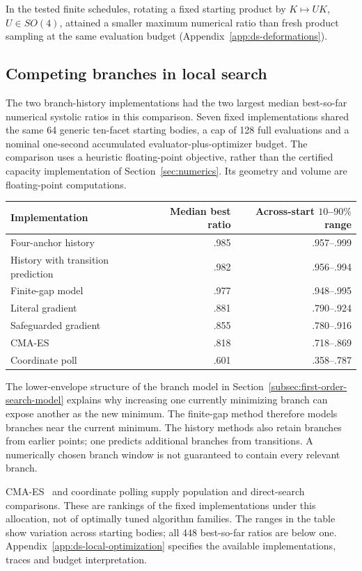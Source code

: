 In the tested finite schedules, rotating a fixed starting product by
$K\mapsto UK$, $U\in SO(4)$, attained a smaller maximum numerical ratio
than fresh product sampling at the same evaluation budget
(Appendix~\ref{app:ds-deformations}).

\subsection{Competing branches in local search}
\label{subsec:black-box-datascience-finite-budget-optimization}

The two branch-history implementations had the two largest median
best-so-far numerical systolic ratios in this comparison. Seven fixed
implementations shared the same 64 generic ten-facet starting bodies, a cap
of 128 full evaluations and a nominal one-second accumulated
evaluator-plus-optimizer budget. The comparison uses a heuristic
floating-point objective, rather than the certified capacity implementation
of Section~\ref{sec:numerics}. Its geometry and volume are floating-point
computations.
\begin{center}
\begin{tabular}{lrr}
\hline
Implementation & Median best ratio & Across-start $10$--$90\%$ range\\
\hline
Four-anchor history & .985 & .957--.999\\
History with transition prediction & .982 & .956--.994\\
Finite-gap model & .977 & .948--.995\\
Literal gradient & .881 & .790--.924\\
Safeguarded gradient & .855 & .780--.916\\
CMA-ES & .818 & .718--.869\\
Coordinate poll & .601 & .358--.787\\
\hline
\end{tabular}
\end{center}
The lower-envelope structure of the branch model in
Section~\ref{subsec:first-order-search-model} explains why increasing one
currently minimizing branch can expose another as the new minimum. The
finite-gap method therefore models branches near the current minimum.
The history methods also retain branches from earlier points; one predicts
additional branches from transitions. A numerically chosen branch window
is not guaranteed to contain every relevant branch.

CMA-ES~\cite{dsHansen2016} and coordinate polling supply population and
direct-search comparisons. These are rankings of the fixed implementations
under this allocation, not of optimally tuned algorithm families. The ranges
in the table show variation across starting bodies; all 448 best-so-far
ratios are below one. Appendix~\ref{app:ds-local-optimization} specifies the
available implementations, traces and budget interpretation.


